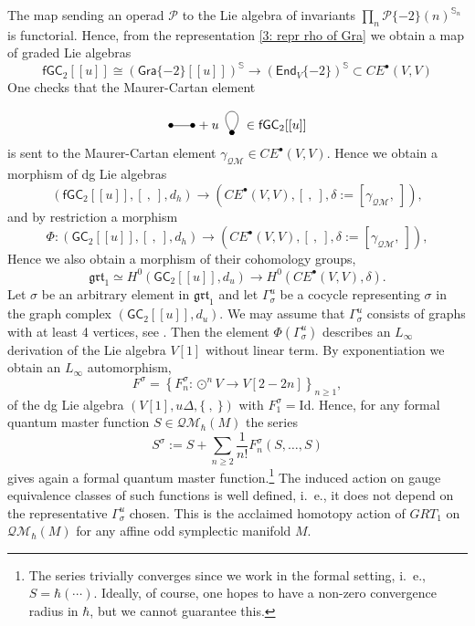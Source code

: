 \documentclass{amsart}
\theoremstyle{plain}
\theoremstyle{definition}
\begin{document}
The map sending an operad ${{\mathcal P}}$ to the Lie algebra of invariants $\prod_n {{\mathcal P}}\{-2\}(n)^{{{\mathbb S}}_n}$ is functorial. Hence, from the representation \eqref{3: repr rho of Gra} we obtain a map of graded Lie algebras
$$
{{\mathsf f}}{{\mathsf G}}{{\mathsf C}}_2[[u]]\cong ({{\mathsf G}} {{\mathsf r}}{{\mathsf a}}\{-2\}[[u]])^{{\mathbb S}} \to ({{\mathsf E}} \mathsf n \mathsf d_V\{-2\})^{{\mathbb S}} \subset CE^{\bullet}(V,V)
$$
One checks that the Maurer-Cartan element
$$ \xy
 (0,0)*{\bullet}="a",
(6,0)*{\bullet}="b",
\ar @{-} "a";"b" <0pt>
\endxy
+ {u} \, \xy
(0,-2)*{\bullet}="A";
(0,-2)*{\bullet}="B";
"A"; "B" **\crv{(6,6) & (-6,6)};
\endxy \in {{\mathsf f}}{{\mathsf G}}{{\mathsf C}}_2[[{u}]]$$
is sent to the Maurer-Cartan element ${\gamma}_{{{\mathcal Q}}{{\mathcal M}}}\in CE^{\bullet}(V,V)$. Hence we obtain a morphism of dg Lie algebras
$$
 \left({{\mathsf f}}{{\mathsf G}}{{\mathsf C}}_2[[{u}]], [\ ,\ ], d_h\right) {\longrightarrow} \left(CE^{\bullet}(V,V), [\ ,\ ], \delta:=[{\gamma}_{{{\mathcal Q}}{{\mathcal M}}},\ ]\right),
$$
and by restriction a morphism
$$
 \Phi\colon \left({{\mathsf G}}{{\mathsf C}}_2[[{u}]], [\ ,\ ], d_h\right) {\longrightarrow} \left(CE^{\bullet}(V,V), [\ ,\ ], \delta:=[{\gamma}_{{{\mathcal Q}}{{\mathcal M}}},\ ]\right),
$$
Hence we also obtain a morphism of their cohomology groups,
$$
{{\mathfrak{{grt}}}_1}\simeq H^0\left({{\mathsf G}}{{\mathsf C}}_2[[{u}]], d_{u}\right) {\longrightarrow} H^0\left(CE^{\bullet}(V,V), \delta\right).
$$
 Let $\sigma$ be an arbitrary element in ${{\mathfrak{{grt}}}_1}$ and let
 ${\Gamma}^{u}_\sigma$ be a cocycle representing $\sigma$ in the graph complex  $({{\mathsf G}}{{\mathsf C}}_2[[{u}]], d_{u})$.
 We may assume that ${\Gamma}^{u}_\sigma$ consists of graphs with at least 4 vertices, see \cite{Wi}.
 Then the element $\Phi({\Gamma}_\sigma^{u})$ describes an $L_\infty$ derivation of the Lie algebra $V[1]$ without linear term.
 By exponentiation we obtain an $L_\infty$ automorphism,
$$
F^\sigma=\left\{F^\sigma_n: \odot^n V {\longrightarrow} V[2-2n]\right\}_{n\geq 1},
$$
of the dg Lie algebra $(V[1], {u}\Delta, \{\ ,\ \})$  with $F^\sigma_1={{\mathrm I\mathrm d}}$.
Hence,  for any  formal quantum master function $S\in {{\mathcal Q}}{{\mathcal M}}_\hbar(M)$ the series
$$
S^\sigma:= S + \sum_{n\geq 2}\frac{1}{n!} F^\sigma_n(S, \ldots, S)
$$
gives again a formal quantum master function.\footnote{The series trivially converges since we work in the formal setting, i.~e., $S=\hbar(\cdots)$. Ideally, of course, one hopes to have a non-zero convergence radius in $\hbar$, but we cannot guarantee this.}
The induced action on gauge equivalence classes of such functions is well defined, i.~e., it does not depend on the representative ${\Gamma}^{u}_\sigma$ chosen. 
This is the acclaimed homotopy action of ${GRT_1}$ on  ${{\mathcal Q}}{{\mathcal M}}_\hbar(M)$
for any affine odd symplectic manifold $M$.
\end{document}
